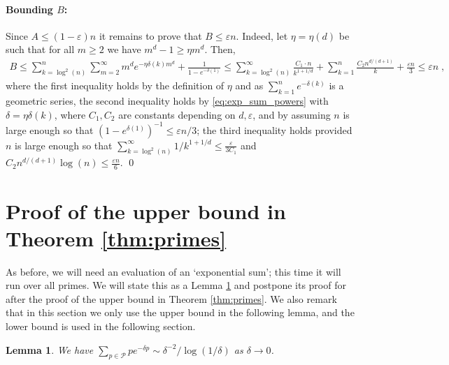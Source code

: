 \documentclass[11pt]{article}
\theoremstyle{plain}
\newtheorem{lemma}[theorem]{Lemma}
\begin{document}
\paragraph{Bounding $B$:}
Since $A \leq (1-\varepsilon)n$ it remains to prove that $B \leq \varepsilon n$. Indeed, let $\eta=\eta(d)$ be such that for all $m\geq 2$ we have $m^{d}-1\geq \eta m^{d}$. Then,
\begin{align*}
    B\leq \sum_{k=\log^{2}(n)}^{n}\sum_{m=2}^{\infty} m^{d} e^{-\eta \delta(k) m^{d}} + \frac{1}{1-e^{-\delta(1)}}
    \leq \sum_{k=\log^2(n)}^{\infty} \frac{C_1 \cdot n}{ k^{1+1/d}} +\sum_{k=1}^{n}\frac{C_2 n^{d/(d+1)}}{ k}+\frac{\varepsilon n}{3}
    \leq \varepsilon n\;,
\end{align*}
where the first inequality holds by the definition of $\eta$ and as $\sum_{k=1}^{n}e^{-\delta(k)}$ is a geometric series, the second inequality holds by \eqref{eq:exp_sum_powers} with $\delta = \eta \delta(k)$, where $C_1,C_2$ are constants depending on $d,\varepsilon$, and by assuming $n$ is large enough so that $(1-e^{\delta(1)})^{-1}\leq \varepsilon n /3$; the third inequality holds provided $n$ is large enough so that $\sum_{k=\log^2(n)}^{\infty}1/k^{1+1/d}\leq \frac{\varepsilon}{3C_1}$ and $C_2 n^{d/(d+1)}\log(n)\leq \frac{\varepsilon n}{6}$. \qed

\section{Proof of the upper bound in Theorem \ref{thm:primes}}\label{sec:mainproof}
As before, we will need an evaluation of an `exponential sum'; this time it will run over all primes. We will state this as a Lemma \ref{lem:prime_sum} and postpone its proof for after the proof of the upper bound in Theorem \ref{thm:primes}. We also remark that in this section we only use the upper bound in the following lemma, and the lower bound is used in the following section.

\begin{lemma}\label{lem:prime_sum}
We have $\sum_{p\in \mathcal{P}} p e^{-\delta p} \sim {\delta^{-2}}/{\log(1/\delta)}$ as $\delta \to 0$.
\end{lemma}
\end{document}
